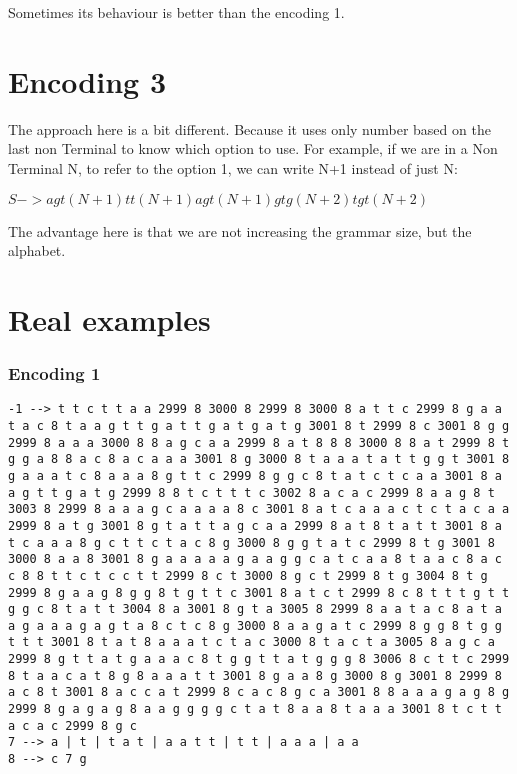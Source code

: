 Sometimes its behaviour is better than the encoding 1.

\section{Encoding 3}

The approach here is a bit different. Because it uses only number based on the 
last non Terminal to know which option to use.
For example, if we are in a Non Terminal N, to refer to the option 1, we can write
N+1 instead of just N:\\
\begin{center}
$S ->agt(N+1)tt(N+1)agt(N+1)gtg(N+2)tgt(N+2)$
\end{center}

The advantage here is that we are not increasing the grammar size, but the alphabet.

\section{Real examples}

\subsubsection{Encoding 1}
\begin{verbatim}
-1 --> t t c t t a a 2999 8 3000 8 2999 8 3000 8 a t t c 2999 8 g a a t a c 8 t a a g t t g a t t g a t g a t g 3001 8 t 2999 8 c 3001 8 g g 2999 8 a a a 3000 8 8 a g c a a 2999 8 a t 8 8 8 3000 8 8 a t 2999 8 t g g a 8 8 a c 8 a c a a a 3001 8 g 3000 8 t a a a t a t t g g t 3001 8 g a a a t c 8 a a a 8 g t t c 2999 8 g g c 8 t a t c t c a a 3001 8 a a g t t g a t g 2999 8 8 t c t t t c 3002 8 a c a c 2999 8 a a g 8 t 3003 8 2999 8 a a a g c a a a a 8 c 3001 8 a t c a a a c t c t a c a a 2999 8 a t g 3001 8 g t a t t a g c a a 2999 8 a t 8 t a t t 3001 8 a t c a a a 8 g c t t c t a c 8 g 3000 8 g g t a t c 2999 8 t g 3001 8 3000 8 a a 8 3001 8 g a a a a a g a a g g c a t c a a 8 t a a c 8 a c c 8 8 t t c t c c t t 2999 8 c t 3000 8 g c t 2999 8 t g 3004 8 t g 2999 8 g a a g 8 g g 8 t g t t c 3001 8 a t c t 2999 8 c 8 t t t g t t g g c 8 t a t t 3004 8 a 3001 8 g t a 3005 8 2999 8 a a t a c 8 a t a a g a a a g a g t a 8 c t c 8 g 3000 8 a a g a t c 2999 8 g g 8 t g g t t t 3001 8 t a t 8 a a a t c t a c 3000 8 t a c t a 3005 8 a g c a 2999 8 g t t a t g a a a c 8 t g g t t a t g g g 8 3006 8 c t t c 2999 8 t a a c a t 8 g 8 a a a t t 3001 8 g a a 8 g 3000 8 g 3001 8 2999 8 a c 8 t 3001 8 a c c a t 2999 8 c a c 8 g c a 3001 8 8 a a a g a g 8 g 2999 8 g a g a g 8 a a g g g g c t a t 8 a a 8 t a a a 3001 8 t c t t a c a c 2999 8 g c 
7 --> a | t | t a t | a a t t | t t | a a a | a a 
8 --> c 7 g 
\end{verbatim}

